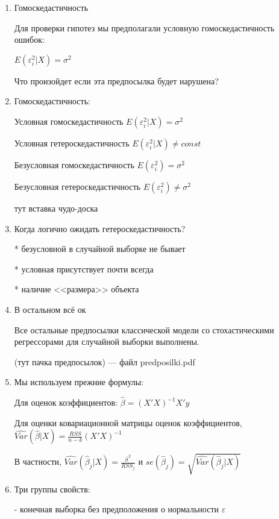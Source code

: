 \documentclass[12pt,a4paper]{article}
\begin{document}
{\Huge

\begin{enumerate}

\item Гомоскедастичность

Для проверки гипотез мы предполагали условную гомоскедастичность ошибок:

$ E(\varepsilon_i^2 | X)=\sigma^2 $

Что произойдет если эта предпосылка будет нарушена?

\item Гомоскедастичность:

Условная гомоскедастичность $E(\varepsilon_i^2 | X)=\sigma^2$

Условная гетероскедастичность  $E(\varepsilon_i^2 | X) \neq const$


Безусловная гомоскедастичность $E(\varepsilon_i^2)=\sigma^2$

Безусловная гетероскедастичность $E(\varepsilon_i^2) \neq \sigma^2$



тут вставка чудо-доска


\item Когда логично ожидать гетероскедастичность?

* безусловной в случайной выборке не бывает

* условная присутствует почти всегда

* наличие <<размера>> объекта

\item В остальном всё ок

Все остальные предпосылки классической модели со стохастическими регрессорами для случайной выборки выполнены.

(тут пачка предпосылок) --- файл predposilki.pdf

\newpage
\item  Мы используем прежние формулы:

Для оценок коэффициентов:
$\hat{\beta}=(X'X)^{-1}X'y$

Для оценки ковариационной матрицы оценок коэффициентов,
$\widehat{Var}(\hat{\beta}|X)=\frac{RSS}{n-k}(X'X)^{-1}$

В частности, $\widehat{Var}(\hat{\beta}_j|X)=\frac{\hat{\sigma}^2}{RSS_j}$
и $se(\hat{\beta}_j)=\sqrt{\widehat{Var}(\hat{\beta}_j|X)}$


\item Три группы свойств:

- конечная выборка без предположения о нормальности $\varepsilon$


\end{enumerate}}
\end{document}
